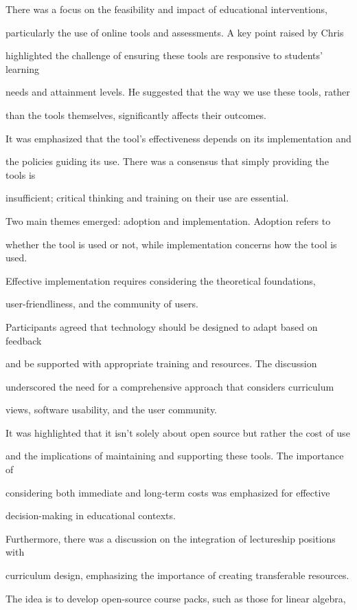 \documentclass[11pt]{article}
\begin{document}
There was a focus on the feasibility and impact of educational interventions,

particularly the use of online tools and assessments. A key point raised by Chris

highlighted the challenge of ensuring these tools are responsive to students' learning

needs and attainment levels. He suggested that the way we use these tools, rather

than the tools themselves, significantly affects their outcomes.

It was emphasized that the tool's effectiveness depends on its implementation and

the policies guiding its use. There was a consensus that simply providing the tools is

insufficient; critical thinking and training on their use are essential.

Two main themes emerged: adoption and implementation. Adoption refers to

whether the tool is used or not, while implementation concerns how the tool is used.

Effective implementation requires considering the theoretical foundations,

user-friendliness, and the community of users.

Participants agreed that technology should be designed to adapt based on feedback

and be supported with appropriate training and resources. The discussion

underscored the need for a comprehensive approach that considers curriculum

views, software usability, and the user community.

It was highlighted that it isn't solely about open source but rather the cost of use

and the implications of maintaining and supporting these tools. The importance of

considering both immediate and long-term costs was emphasized for effective

decision-making in educational contexts.

Furthermore, there was a discussion on the integration of lectureship positions with

curriculum design, emphasizing the importance of creating transferable resources.

The idea is to develop open-source course packs, such as those for linear algebra,
\end{document}
